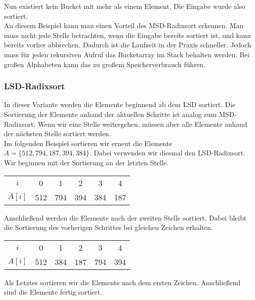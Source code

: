 Nun existiert kein Bucket mit mehr als einem Element. Die Eingabe wurde also sortiert. \\

An diesem Beispiel kann man einen Vorteil des MSD-Radixsort erkennen. Man muss nicht jede Stelle betrachten, wenn die Eingabe bereits sortiert ist, und kann bereits vorher abbrechen. Dadurch ist die Laufzeit in der Praxis schneller. Jedoch muss für jeden rekursiven Aufruf das Bucketarray im Stack behalten werden. Bei großen Alphabeten kann das zu großem Speicherverbrauch führen.


\subsubsection{LSD-Radixsort}
\label{sort:radix:lsd}

In dieser Variante werden die Elemente beginnend ab dem LSD sortiert. Die Sortierung der Elemente anhand der aktuellen Schritte ist analog zum MSD-Radixsort. Wenn wir eine Stelle weitergehen, müssen aber alle Elemente anhand der nächsten Stelle sortiert werden. \\

Im folgenden Beispiel sortieren wir erneut die Elemente $A=\{512, 794, 187, 394, 384\}$. Dabei verwenden wir diesmal den LSD-Radixsort. Wir beginnen mit der Sortierung an der letzten Stelle.

\begin{table}[H]
	\centering
	\begin{tabular}{c|| c | c c c | c }
		$i$ & 0 & 1 & 2 & 3 & 4 \\
		$A[i]$ & 512 & 794 & 394 & 384 & 187
	\end{tabular}
	\label{tab:radix:lsd:step_1}
\end{table}

Anschließend werden die Elemente nach der zweiten Stelle sortiert. Dabei bleibt die Sortierung des vorherigen Schrittes bei gleichen Zeichen erhalten.

\begin{table}[H]
	\centering
	\begin{tabular}{c|| c | c | c | c | c }
		$i$ & 0 & 1 & 2 & 3 & 4 \\
		$A[i]$ & 512 & 384 & 187 & 794 & 394
	\end{tabular}
	\label{tab:radix:lsd:step_2}
\end{table}

Als Letztes sortieren wir die Elemente nach dem ersten Zeichen. Anschließend sind die Elemente fertig sortiert.

